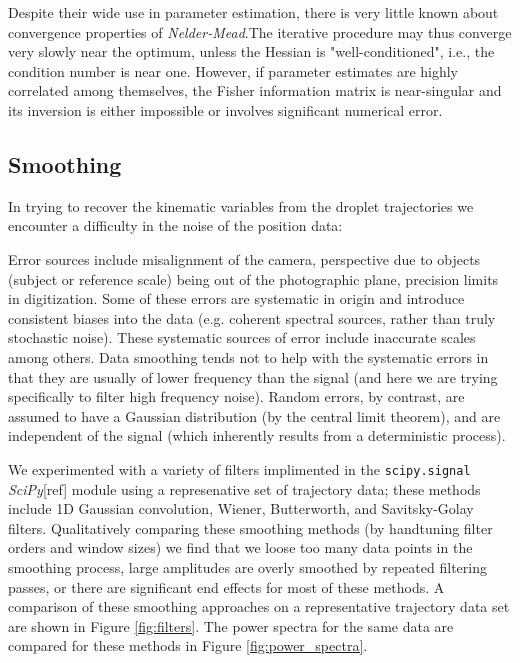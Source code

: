 \documentclass[10pt,a4paper]{article}
\begin{document}
Despite their wide use in parameter estimation, there is very little known about convergence properties of \emph{Nelder-Mead}.The iterative procedure may thus converge very slowly near the optimum, unless the Hessian is "well-conditioned", i.e., the condition number is near one. However, if parameter estimates are highly correlated among themselves, the Fisher information matrix is near-singular and its inversion is either impossible or involves significant numerical error.  

\subsection{Smoothing}
In trying to recover the kinematic variables from the droplet trajectories we encounter a difficulty in the noise of the position data:

Error sources include misalignment of the camera, perspective due to objects (subject or reference scale) being out of the photographic plane, precision limits in digitization. Some of these errors are systematic in origin and introduce consistent biases into the data (e.g. coherent spectral sources, rather than truly stochastic noise). These systematic sources of error include inaccurate scales among others. Data smoothing tends not to help with the systematic errors in that they are usually of lower frequency than the signal (and here we are trying specifically to filter high frequency noise). Random errors, by contrast, are assumed to have a Gaussian distribution (by the central limit theorem), and are independent of the signal (which inherently results from a deterministic process).

We experimented with a variety of filters implimented in the \verb|scipy.signal| \emph{SciPy}[ref] module using a represenative set of trajectory data; these methods include 1D Gaussian convolution, Wiener, Butterworth, and Savitsky-Golay filters. Qualitatively comparing these smoothing methods (by handtuning filter orders and window sizes) we find that we loose too many data points in the smoothing process, large amplitudes are overly smoothed by repeated filtering passes, or there are significant end effects for most of these methods. A comparison of these smoothing approaches on a representative trajectory data set are shown in Figure \ref{fig:filters}. The power spectra for the same data are compared for these methods in Figure \ref{fig:power_spectra}.

\end{document}
